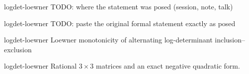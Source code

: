

\begin{cxcredits}
\end{cxcredits}


\begin{cxsource}{logdet-loewner}
TODO: where the statement was posed (session, note, talk)
\end{cxsource}

\begin{cxstatement}{logdet-loewner}
TODO: paste the original formal statement exactly as posed
\end{cxstatement}

\begin{cxsummary}{logdet-loewner}
Loewner monotonicity of alternating log-determinant inclusion--exclusion
\end{cxsummary}

\begin{cxcertificate}{logdet-loewner}
Rational $3\times3$ matrices and an exact negative quadratic form.
\end{cxcertificate}

